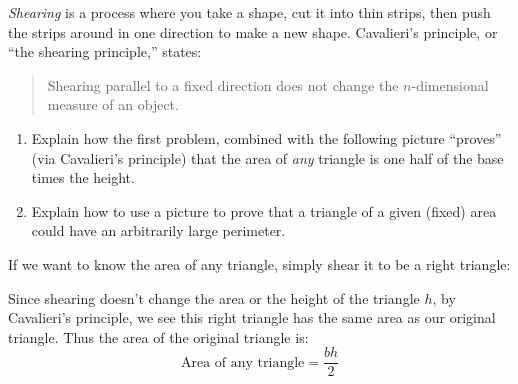 \documentclass[nooutcomes,noauthor,handout,hints]{ximera}
\begin{document}
\begin{question}
  \emph{Shearing} is a process where you take a shape, cut it into thin strips, 
  then push the strips around in one direction to make a new shape.  
  Cavalieri's principle, or ``the shearing principle,'' states:
  \begin{quote}
    Shearing parallel to a fixed direction does not change the
    $n$-dimensional measure of an object.
  \end{quote}
 \begin{enumerate}
  \item Explain how the first problem, combined with the following
  picture ``proves'' (via Cavalieri's principle) that the area of \emph{any}
  triangle is one half of the base times the height.
  \begin{center}
  \end{center}
  \vfill 
  \item Explain how to use a picture to prove that a triangle of a
    given (fixed) area could have an arbitrarily large perimeter.
    \vfill \vfill
  \end{enumerate}
  
  \begin{freeResponse}
    If we want to know the area of any triangle, simply shear it to be a right triangle:
      \begin{center}
      \end{center}
    Since shearing doesn't change the area or the height of the
    triangle $h$, by Cavalieri's principle, we see this right triangle
    has the same area as our original triangle. Thus the area of the
    original triangle is:
    \[
    \text{Area of any triangle} = \frac{bh}{2}
    \]
  \end{freeResponse}
\end{question}
\end{document}
